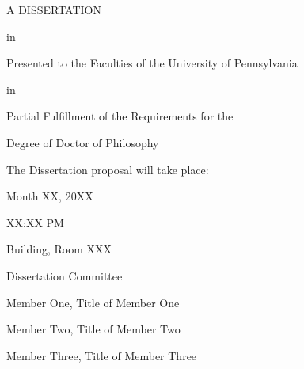 \begin{titlepage}
\thispagestyle{empty} %
\begin{center}


\mytitle

\myauthor

A DISSERTATION

in 

\mydepartment 

Presented to the Faculties of the University of Pennsylvania

in 

Partial Fulfillment of the Requirements for the

Degree of Doctor of Philosophy

\myyear

\vfill

The Dissertation proposal will take place:

Month XX, 20XX 

XX:XX PM

Building, Room XXX

\vfill
\end{center}

\vfill %


\begin{flushleft}

%
%
%
%
%
%
%
%
%
%

\singlespacing

Dissertation Committee %

\blankline

Member One, Title of Member One

Member Two, Title of Member Two

Member Three, Title of Member Three

\end{flushleft}

\end{titlepage}


